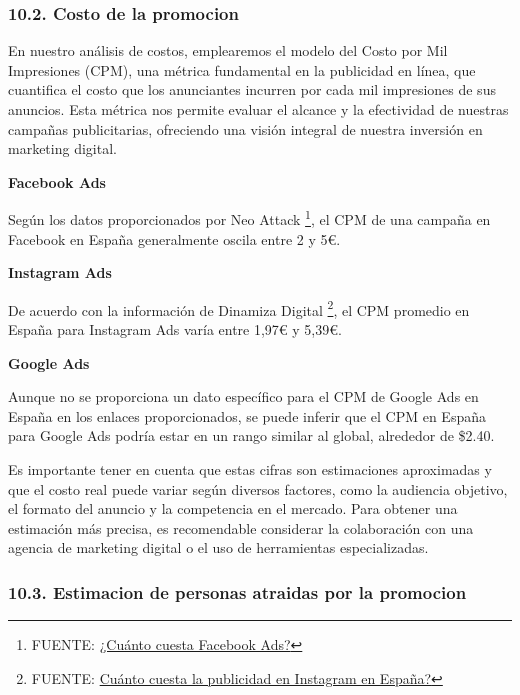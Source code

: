 \documentclass[
]{article}
\begin{document}
\subsubsection{10.2. Costo de la promocion}\label{costo-de-la-promocion}

En nuestro análisis de costos, emplearemos el modelo del Costo por Mil
Impresiones (CPM), una métrica fundamental en la publicidad en línea,
que cuantifica el costo que los anunciantes incurren por cada mil
impresiones de sus anuncios. Esta métrica nos permite evaluar el alcance
y la efectividad de nuestras campañas publicitarias, ofreciendo una
visión integral de nuestra inversión en marketing digital.

\textbf{Facebook Ads}

Según los datos proporcionados por Neo Attack \footnote{FUENTE:
  \href{https://neoattack.com/blog/cuanto-cuesta-facebook-ads/\#:~:text=tipo\%20de\%20empresas.-,Cu\%C3\%A1nto\%20cuesta\%20Facebook\%20Ads\%20en\%20Espa\%C3\%B1a,entre\%200.5\%20y\%203\%E2\%82\%AC.}{¿Cuánto
  cuesta Facebook Ads?}}, el CPM de una campaña en Facebook en España
generalmente oscila entre 2 y 5€.

\textbf{Instagram Ads}

De acuerdo con la información de Dinamiza Digital \footnote{FUENTE:
  \href{https://dinamizadigital.com/cuanto-cuesta-la-publicidad-en-instagram/}{Cuánto
  cuesta la publicidad en Instagram en España?}}, el CPM promedio en
España para Instagram Ads varía entre 1,97€ y 5,39€.

\textbf{Google Ads}

Aunque no se proporciona un dato específico para el CPM de Google Ads en
España en los enlaces proporcionados, se puede inferir que el CPM en
España para Google Ads podría estar en un rango similar al global,
alrededor de \$2.40.

Es importante tener en cuenta que estas cifras son estimaciones
aproximadas y que el costo real puede variar según diversos factores,
como la audiencia objetivo, el formato del anuncio y la competencia en
el mercado. Para obtener una estimación más precisa, es recomendable
considerar la colaboración con una agencia de marketing digital o el uso
de herramientas especializadas.

\subsubsection{10.3. Estimacion de personas atraidas por la
promocion}\label{estimacion-de-personas-atraidas-por-la-promocion}
\end{document}
